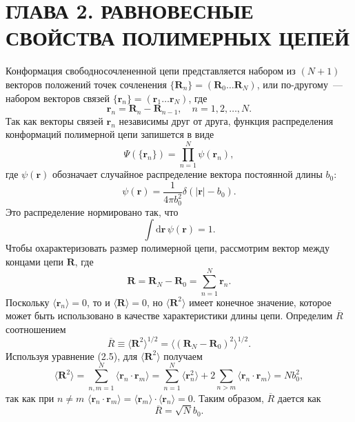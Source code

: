 \documentclass[12pt,a4paper]{article}
\begin{document}
\section*{ГЛАВА 2. РАВНОВЕСНЫЕ СВОЙСТВА ПОЛИМЕРНЫХ ЦЕПЕЙ}

Конформация свободносочлененной цепи представляется набором из $(N + 1)$ векторов положений точек сочленения $\{\boldsymbol{R}_n\} = (\boldsymbol{R}_0 \dots \boldsymbol{R}_N)$, или по-другому~--- набором векторов связей $\{\boldsymbol{r}_n\} = (\boldsymbol{r}_1 \dots \boldsymbol{r}_N)$, где
\begin{equation}
\boldsymbol{r}_n = \boldsymbol{R}_n - \boldsymbol{R}_{n-1}, \quad n = 1, 2, \dots, N. \tag{2.1}
\end{equation}
Так как векторы связей $\boldsymbol{r}_n$ независимы друг от друга, функция распределения конформаций полимерной цепи запишется в виде
\begin{equation}
\Psi(\{\boldsymbol{r}_n\}) = \prod_{n=1}^N \psi(\boldsymbol{r}_n), \tag{2.2}
\end{equation}
где $\psi(\boldsymbol{r})$ обозначает случайное распределение вектора постоянной длины $b_0$:
\begin{equation}
\psi(\boldsymbol{r}) = \frac{1}{4\pi b_0^2}\delta(|\boldsymbol{r}| - b_0). \tag{2.3}
\end{equation}
Это распределение нормировано так, что
\begin{equation}
\int \!\mathrm{d}\boldsymbol{r}\,\psi(\boldsymbol{r}) = 1. \tag{2.4}
\end{equation}
Чтобы охарактеризовать размер полимерной цепи, рассмотрим вектор между концами цепи $\boldsymbol{R}$, где
\begin{equation}
\boldsymbol{R} = \boldsymbol{R}_N - \boldsymbol{R}_0 = \sum_{n=1}^N \boldsymbol{r}_n. \tag{2.5}
\end{equation}
Поскольку $\langle\boldsymbol{r}_n\rangle = 0$, то и $\langle\boldsymbol{R}\rangle = 0$, но $\langle\boldsymbol{R}^2\rangle$ имеет конечное значение, которое может быть использовано в качестве характеристики длины цепи. Определим $\overline{R}$ соотношением
\begin{equation}
\overline{R} \equiv \langle\boldsymbol{R}^2\rangle^{1/2} = \langle(\boldsymbol{R}_N - \boldsymbol{R}_0)^2\rangle^{1/2}. \tag{2.6}
\end{equation}
Используя уравнение (2.5), для $\langle\boldsymbol{R}^2\rangle$ получаем
\begin{equation}
\langle\boldsymbol{R}^2\rangle = \sum_{n,m=1}^N \langle\boldsymbol{r}_n \cdot \boldsymbol{r}_m\rangle = \sum_{n=1}^N \langle\boldsymbol{r}_n^2\rangle + 2\sum_{n>m}\langle\boldsymbol{r}_n \cdot \boldsymbol{r}_m\rangle = Nb_0^2, \tag{2.7}
\end{equation}
так как при $n \ne m$ $\langle\boldsymbol{r}_n \cdot \boldsymbol{r}_m\rangle = \langle\boldsymbol{r}_m\rangle \cdot \langle\boldsymbol{r}_n\rangle = 0$. Таким образом, $\overline{R}$ дается как
\begin{equation}
\overline{R} = \sqrt{N}b_0. \tag{2.8}
\end{equation}
\end{document}
